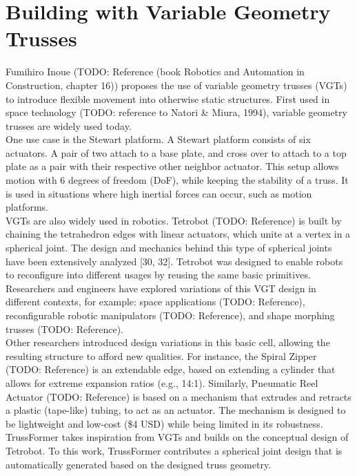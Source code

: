 \section{Building with Variable Geometry Trusses}
Fumihiro Inoue (TODO: Reference (book Robotics and Automation in Construction, chapter 16)) proposes the use of variable geometry trusses (VGTs) to introduce flexible movement into otherwise static structures. First used in space technology (TODO: reference to Natori \& Miura,
1994), variable geometry trusses are widely used today.\\
One use case is the Stewart platform. A Stewart platform consists of six actuators. A pair of two attach to a base plate, and cross over to attach to a top plate as a pair with their respective other neighbor actuator. This setup allows motion with 6 degrees of freedom (DoF), while keeping the stability of a truss. It is used in situations where high inertial forces can occur, such as motion platforms.\\
VGTs are also widely used in robotics. Tetrobot (TODO: Reference) is built by chaining the tetrahedron edges with linear actuators, which unite at a vertex in a spherical joint. The design and mechanics behind this type of spherical joints have been extensively analyzed [30, 32]. Tetrobot was designed to enable robots to reconfigure into different usages by reusing the same basic primitives. Researchers and engineers have explored variations of this VGT design in different contexts, for example: space applications (TODO: Reference), reconfigurable robotic manipulators (TODO: Reference), and shape morphing trusses (TODO: Reference).\\
Other researchers introduced design variations in this basic cell, allowing the resulting structure to afford new qualities. For instance, the Spiral Zipper (TODO: Reference) is an extendable edge, based on extending a cylinder that allows for extreme expansion ratios (e.g., 14:1). Similarly, Pneumatic Reel Actuator (TODO: Reference) is based on a mechanism that extrudes and retracts a plastic (tape-like) tubing, to act as an actuator. The mechanism is designed to be lightweight and low-cost (\$4 USD) while being limited in its robustness.\\
TrussFormer takes inspiration from VGTs and builds on the conceptual design of Tetrobot. To this work, TrussFormer contributes a spherical joint design that is automatically generated based on the designed truss geometry.

